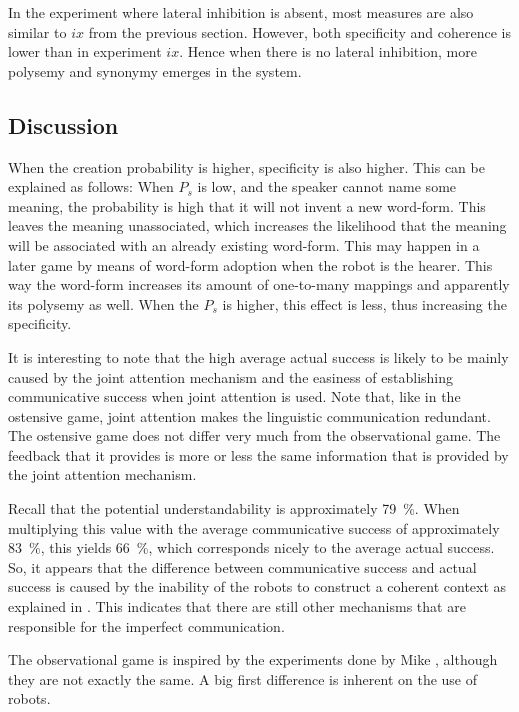 In the experiment where lateral inhibition is absent, most measures are also similar to $ix$ from the previous section. However, both specificity and coherence is lower than in experiment $ix$. Hence when there is no lateral inhibition, more polysemy and synonymy emerges in the system.

\subsection{Discussion}

When the creation probability is higher, specificity is also higher. This can be explained as follows: When $P_s$ is low, and the speaker cannot name some meaning, the probability is high that it will not invent a new word-form. This leaves the meaning unassociated, which increases the likelihood that the meaning will be associated with an already existing word-form. This may happen in a later game by means of word-form adoption when the robot is the hearer. This way the word-form increases its amount of one-to-many mappings and apparently its polysemy as well. When the $P_s$ is higher, this effect is less, thus increasing the specificity.

It is interesting to note that the high average actual success is likely to be mainly caused by the joint attention mechanism and the easiness of establishing communicative success when joint attention is used. Note that, like in the ostensive game, joint attention makes the linguistic communication redundant. The ostensive game does not differ very much from the observational game. The feedback that it provides is more or less the same information that is provided by the joint attention mechanism.

Recall that the potential understandability is approximately 79~\%. When multiplying this value with the average communicative success of approximately 83~\%, this yields 66~\%, which corresponds nicely to the average actual success. So, it appears that the difference between communicative success and actual success is caused by the inability of the robots to construct a coherent context as explained in . This indicates that there are still other mechanisms that are responsible for the imperfect communication.

The observational game is inspired by the experiments done by Mike \citet{oliphant:1997,oliphant:1998,oliphant:2000}, although they are not exactly the same. A big first difference is inherent on the use of robots.

